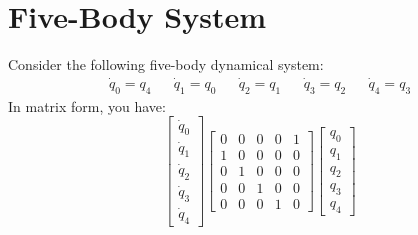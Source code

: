 \section{Five-Body System}
Consider the following five-body dynamical system:
\begin{align}
    \dot{q}_{0} = q_{4} && \dot{q}_{1} = q_{0} && \dot{q}_{2} = q_{1} && \dot{q}_{3} = q_{2} && \dot{q}_{4} = q_{3}
\end{align}
In matrix form, you have:
\begin{equation}
    \begin{bmatrix}
        \dot{q}_{0} \\ \dot{q}_{1} \\ \dot{q}_{2} \\ \dot{q}_{3} \\ \dot{q}_{4}
    \end{bmatrix} \begin{bmatrix}
        0 & 0 & 0 & 0 & 1 \\
        1 & 0 & 0 & 0 & 0 \\
        0 & 1 & 0 & 0 & 0 \\
        0 & 0 & 1 & 0 & 0 \\
        0 & 0 & 0 & 1 & 0
    \end{bmatrix} \begin{bmatrix}
        q_{0} \\ q_{1} \\ q_{2} \\ q_{3} \\ q_{4}
    \end{bmatrix}
\end{equation}
